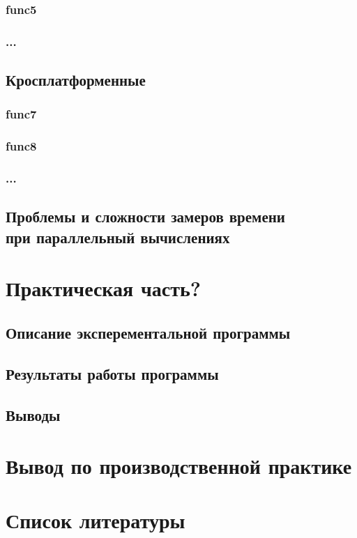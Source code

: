 \documentclass{article}
\begin{document}
			\subsubsection{func5}
			\subsubsection{...}
	\newpage
		\subsection{Кросплатформенные}
			\subsubsection{func7}
			\subsubsection{func8}
			\subsubsection{...}
		\subsection{Проблемы и сложности замеров времени \\ при параллельный вычислениях}
	\newpage
	\section{Практическая часть?}
		\subsection{Описание эксперементальной программы}
		\subsection{Результаты работы программы}
		\subsection{Выводы}
	\newpage
	\section{Вывод по производственной практике}
	\newpage
	\section{Список литературы}
\end{document}
